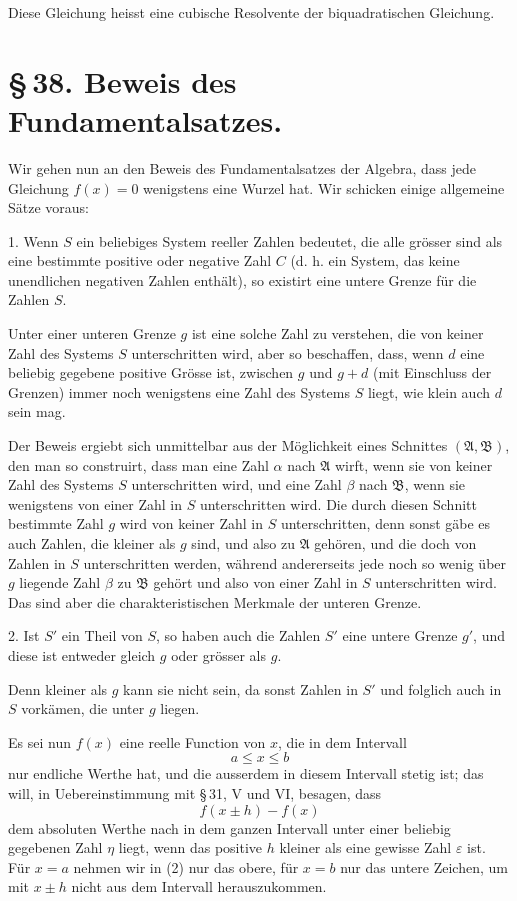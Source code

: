 \documentclass[11pt]{article}
\begin{document}
Diese Gleichung heisst eine cubische Resolvente der biquadratischen Gleichung.

\section*{\S\,38. Beweis des Fundamentalsatzes.}

Wir gehen nun an den Beweis des Fundamentalsatzes der Algebra, dass jede Gleichung $f(x)=0$ wenigstens eine Wurzel hat. Wir schicken einige allgemeine Sätze voraus:

1. Wenn $S$ ein beliebiges System reeller Zahlen bedeutet, die alle grösser sind als eine bestimmte positive oder negative Zahl $C$ (d. h. ein System, das keine unendlichen negativen Zahlen enthält), so existirt eine untere Grenze für die Zahlen $S$.

Unter einer unteren Grenze $g$ ist eine solche Zahl zu verstehen, die von keiner Zahl des Systems $S$ unterschritten wird, aber so beschaffen, dass, wenn $d$ eine beliebig gegebene positive Grösse ist, zwischen $g$ und $g+d$ (mit Einschluss der Grenzen) immer noch wenigstens eine Zahl des Systems $S$ liegt, wie klein auch $d$ sein mag.

Der Beweis ergiebt sich unmittelbar aus der Möglichkeit eines Schnittes $(\mathfrak A,\mathfrak B)$, den man so construirt, dass man eine Zahl $\alpha$ nach $\mathfrak A$ wirft, wenn sie von keiner Zahl des Systems $S$ unterschritten wird, und eine Zahl $\beta$ nach $\mathfrak B$, wenn sie wenigstens von einer Zahl in $S$ unterschritten wird. Die durch diesen Schnitt bestimmte Zahl $g$ wird von keiner Zahl in $S$ unterschritten, denn sonst gäbe es auch Zahlen, die kleiner als $g$ sind, und also zu $\mathfrak A$ gehören, und die doch von Zahlen in $S$ unterschritten werden, während andererseits jede noch so wenig über $g$ liegende Zahl $\beta$ zu $\mathfrak B$ gehört und also von einer Zahl in $S$ unterschritten wird. Das sind aber die charakteristischen Merkmale der unteren Grenze.

2. Ist $S'$ ein Theil von $S$, so haben auch die Zahlen $S'$ eine untere Grenze $g'$, und diese ist entweder gleich $g$ oder grösser als $g$.

Denn kleiner als $g$ kann sie nicht sein, da sonst Zahlen in $S'$ und folglich auch in $S$ vorkämen, die unter $g$ liegen.

Es sei nun $f(x)$ eine reelle Function von $x$, die in dem Intervall
\begin{equation}
 a\le x\le b
\tag{1}
\end{equation}
nur endliche Werthe hat, und die ausserdem in diesem Intervall stetig ist; das will, in Uebereinstimmung mit \S\,31, V und VI, besagen, dass
\begin{equation}
 f(x\pm h)-f(x)
\tag{2}
\end{equation}
dem absoluten Werthe nach in dem ganzen Intervall unter einer beliebig gegebenen Zahl $\eta$ liegt, wenn das positive $h$ kleiner als eine gewisse Zahl $\varepsilon$ ist. Für $x=a$ nehmen wir in (2) nur das obere, für $x=b$ nur das untere Zeichen, um mit $x\pm h$ nicht aus dem Intervall herauszukommen.
\end{document}
